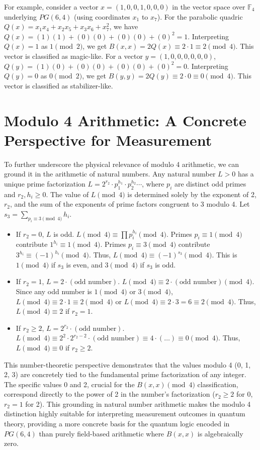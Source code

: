 \documentclass{article}
\begin{document}
For example, consider a vector $x = (1, 0, 0, 1, 0, 0, 0)$ in the vector space over $\mathbb{F}_4$ underlying $PG(6,4)$ (using coordinates $x_1$ to $x_7$). For the parabolic quadric $Q(x) = x_1x_4 + x_2x_5 + x_3x_6 + x_7^2$, we have $Q(x) = (1)(1) + (0)(0) + (0)(0) + (0)^2 = 1$. Interpreting $Q(x)=1$ as $1 \pmod 2$, we get $B(x,x) = 2Q(x) \equiv 2 \cdot 1 \equiv 2 \pmod 4$. This vector is classified as magic-like. For a vector $y = (1, 0, 0, 0, 0, 0, 0)$, $Q(y) = (1)(0) + (0)(0) + (0)(0) + (0)^2 = 0$. Interpreting $Q(y)=0$ as $0 \pmod 2$, we get $B(y,y) = 2Q(y) \equiv 2 \cdot 0 \equiv 0 \pmod 4$. This vector is classified as stabilizer-like.

\section{Modulo 4 Arithmetic: A Concrete Perspective for Measurement}
To further underscore the physical relevance of modulo 4 arithmetic, we can ground it in the arithmetic of natural numbers. Any natural number $L > 0$ has a unique prime factorization $L = 2^{r_2} \cdot p_1^{h_1} \cdot p_2^{h_2} \cdots$, where $p_i$ are distinct odd primes and $r_2, h_i \ge 0$. The value of $L \pmod 4$ is determined solely by the exponent of 2, $r_2$, and the sum of the exponents of prime factors congruent to 3 modulo 4. Let $s_3 = \sum_{p_i \equiv 3 \pmod 4} h_i$.
\begin{itemize}
    \item If $r_2 = 0$, $L$ is odd. $L \pmod 4 \equiv \prod p_i^{h_i} \pmod 4$. Primes $p_i \equiv 1 \pmod 4$ contribute $1^{h_i} \equiv 1 \pmod 4$. Primes $p_i \equiv 3 \pmod 4$ contribute $3^{h_i} \equiv (-1)^{h_i} \pmod 4$. Thus, $L \pmod 4 \equiv (-1)^{s_3} \pmod 4$. This is $1 \pmod 4$ if $s_3$ is even, and $3 \pmod 4$ if $s_3$ is odd.
    \item If $r_2 = 1$, $L = 2 \cdot (\text{odd number})$. $L \pmod 4 \equiv 2 \cdot (\text{odd number}) \pmod 4$. Since any odd number is $1 \pmod 4$ or $3 \pmod 4$, $L \pmod 4 \equiv 2 \cdot 1 \equiv 2 \pmod 4$ or $L \pmod 4 \equiv 2 \cdot 3 = 6 \equiv 2 \pmod 4$. Thus, $L \pmod 4 \equiv 2$ if $r_2 = 1$.
    \item If $r_2 \ge 2$, $L = 2^{r_2} \cdot (\text{odd number})$. $L \pmod 4 \equiv 2^2 \cdot 2^{r_2-2} \cdot (\text{odd number}) \equiv 4 \cdot (\dots) \equiv 0 \pmod 4$. Thus, $L \pmod 4 \equiv 0$ if $r_2 \ge 2$.
\end{itemize}
This number-theoretic perspective demonstrates that the values modulo 4 (0, 1, 2, 3) are concretely tied to the fundamental prime factorization of any integer. The specific values 0 and 2, crucial for the $B(x,x) \pmod 4$ classification, correspond directly to the power of 2 in the number's factorization ($r_2 \ge 2$ for 0, $r_2 = 1$ for 2). This grounding in natural number arithmetic makes the modulo 4 distinction highly suitable for interpreting measurement outcomes in quantum theory, providing a more concrete basis for the quantum logic encoded in $PG(6,4)$ than purely field-based arithmetic where $B(x,x)$ is algebraically zero.
\end{document}
